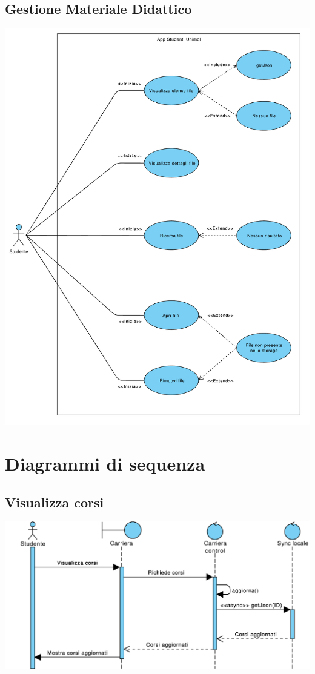 \subsection{Gestione Materiale Didattico}
\begin{center}
	\includegraphics[width=6.5in]{imgs/gruppo1/use_case_diagrams/UCD3-materiale_didattico.pdf}
\end{center}
\newpage




\section{Diagrammi di sequenza}


\subsection{Visualizza corsi}
\begin{center}
	\includegraphics[width=6.5in]{imgs/gruppo1/sequence_diagrams/SD1_visualizza_corsi.pdf}
\end{center}
